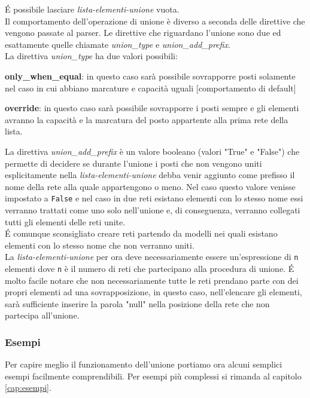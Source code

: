 \documentclass[italian,12pt]{book}
\begin{document}
\'E  possibile lasciare \emph{lista-elementi-unione} vuota. \\
Il comportamento dell'operazione di unione è diverso a seconda delle
direttive che vengono passate al parser. Le direttive che riguardano
l'unione sono due ed esattamente quelle chiamate \emph{union\_type} e
\emph{union\_add\_prefix}.\\
La direttiva \emph{union\_type} ha due valori possibili:
\begin{description}
\item{{\bf only\_when\_equal}}: in questo caso sarà possibile
  sovrapporre posti solamente nel caso in cui abbiano marcature e
  capacità uguali [comportamento di default]
\item{{\bf override}}: in questo caso sarà possibile sovrapporre i
  posti sempre e gli elementi avranno la capacità e la marcatura del
  posto appartente alla prima rete della lista.
\end{description}
La direttiva \emph{union\_add\_prefix} è un valore booleano (valori
"True" e "False") che permette di decidere se durante l'unione i posti
che non vengono uniti esplicitamente nella
\emph{lista-elementi-unione} debba venir aggiunto come prefisso il
nome della rete alla quale appartengono o meno. Nel caso questo valore
venisse impostato a {\tt False} e nel caso in due reti esistano
elementi con lo stesso nome essi verranno trattati come uno solo
nell'unione e, di conseguenza, verranno collegati tutti gli elementi
delle reti unite.\\
\'E comunque sconsigliato creare reti partendo da modelli nei quali
esistano elementi con lo stesso nome che non verranno uniti.\\
La \emph{lista-elementi-unione} per ora deve necessariamente essere
un'espressione di {\tt n} elementi dove {\tt n} è il numero di reti
che partecipano alla procedura di unione. \'E molto facile notare che
non necessariamente tutte le reti prendano parte con dei propri
elementi ad una sovrapposizione, in questo caso, nell'elencare gli
elementi, sarà sufficiente inserire la parola "null" nella posizione
della rete che non partecipa all'unione.

\subsubsection{Esempi}
Per capire meglio il funzionamento dell'unione portiamo ora alcuni semplici
esempi facilmente comprendibili. Per esempi più complessi si rimanda al capitolo
\ref{cap:esempi}.
\end{document}
